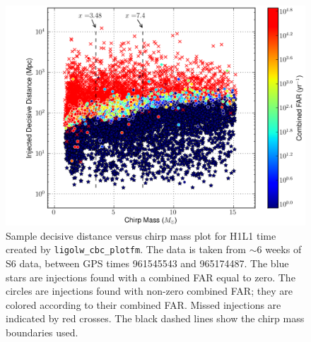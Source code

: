 \begin{figure}[p]
\label{fig:plotfm-dist_v_mchirp}
\begin{center}
\includegraphics[width=6in]{figures/H1L1-ligolw_cbc_plotfm_fm_dist_v_param_ALLINJ_CAT_4_VETO_F1_ALLINJ_PLOTTED-956707143-4838544.png}
\end{center}
\caption{Sample decisive distance versus chirp mass plot for H1L1 time created by \texttt{ligolw\_cbc\_plotfm}. The data is taken from $\sim6$ weeks of \ac{S6} data, between GPS times 961545543 and 965174487. The blue stars are injections found with a combined \ac{FAR} equal to zero. The circles are injections found with non-zero combined \ac{FAR}; they are colored according to their combined \ac{FAR}. Missed injections are indicated by red crosses. The black dashed lines show the chirp mass boundaries used.}
\end{figure}

